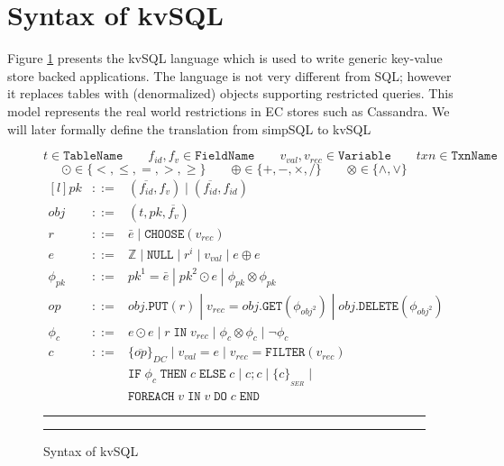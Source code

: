 \documentclass[12pt,letter]{article}
\begin{document}
\section{Syntax of kvSQL}
Figure \ref{fig:syn} presents the kvSQL language which is used to write
generic key-value store backed applications. The language is not very
different from SQL; however it replaces tables with (denormalized)
objects supporting restricted queries. This model represents the real world restrictions in EC stores such as Cassandra. We will later formally define the
translation from simpSQL to kvSQL
\begin{figure}[h]
	$$
	t \in \texttt{TableName} \qquad 
	f_{id},f_v \in \texttt{FieldName} \qquad 
	v_{val},v_{rec} \in \texttt{Variable} \qquad
	txn \in \texttt{TxnName}
	$$
	\vspace{-6mm} %
	$$ \odot \in \{<,\leq,=,>,\geq\} \qquad 
	\oplus \in \{+,-,\times,/ \} \qquad 
	\otimes \in \{\wedge, \vee\}
	$$ 
	$$
	\begin{matrix*}[l]
		pk & ::= & (\overline{f_{id}},f_v)\;|\;(\overline{f_{id}},f_{id})\\
		obj &  ::= & (t,pk,\overline{f_v}) \\
		r &  ::= & \bar{e}\;|\; \texttt{CHOOSE}(v_{rec}) \\
		e &  ::= & \mathbb{Z} \;|\; \texttt{NULL} \;|\; r^i \;|\; v_{val} \;|\; e \oplus e \\
		\phi_{pk}  & ::= & pk^{1} = \bar{e} \;|\; pk^{2} \odot e
		\;|\; \phi_{pk} \otimes \phi_{pk} \\
		op   & ::= & obj.\texttt{PUT}(r) \;|\; 
		v_{rec} = obj.\texttt{GET}(\phi_{obj^{2}}) \;|\;  obj.\texttt{DELETE}(\phi_{obj^{2}})  \\
		\phi_{c}  & ::= & e\odot e \;|\;  r\;\texttt{IN} \; v_{rec} \;|\; \phi_{c} 
		\otimes \phi_{c} \;|\; \neg \phi_{c} \\
		c   & ::=  & \{\overline{op}\}_{DC}
		\;|\; v_{val} = e \;|\; v_{rec} = \texttt{FILTER} (v_{rec})
		\\  & & \texttt{IF}\; \phi_c \;\texttt{THEN} \;c \;\texttt{ELSE}\; c \;|\;  c;c \;|\;
		\{c\}_{_{SER}} \;|\;
		\\  & & \texttt{FOREACH}\; v \;\texttt{IN} \; v \; \texttt{DO}\; c \;\texttt{END}
		
	\end{matrix*}
	$$
	\hrule \hrule 
\caption{Syntax of kvSQL}
\label{fig:syn}
\end{figure}
\end{document}
